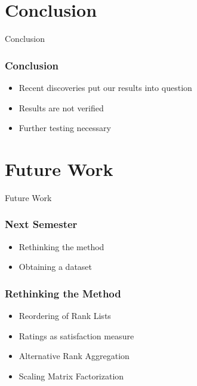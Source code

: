 \section{Conclusion}

\begin{frame}
	\begin{center}
		\huge Conclusion
	\end{center}
\end{frame}

\begin{frame}
	\frametitle{Conclusion}
	\begin{itemize}
		\item Recent discoveries put our results into question
		\item Results are not verified
		\item Further testing necessary
	\end{itemize}
\end{frame}

\section{Future Work}

\begin{frame}
	\begin{center}
		\huge Future Work
	\end{center}
\end{frame}

\begin{frame}
	\frametitle{Next Semester}
	\begin{itemize}
		\item Rethinking the method
		\item Obtaining a dataset
	\end{itemize}
\end{frame}

\begin{frame}
	\frametitle{Rethinking the Method}
	\begin{itemize}
		\item Reordering of Rank Lists
		\item Ratings as satisfaction measure
		\item Alternative Rank Aggregation
		\item Scaling Matrix Factorization
	\end{itemize}
\end{frame}

